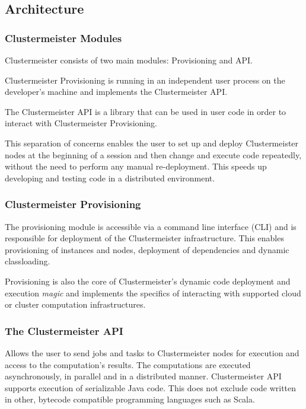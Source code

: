 \documentclass[english]{uzhpub}
\begin{document}
\subsection{Architecture}

\subsubsection{Clustermeister Modules}

Clustermeister consists of two main modules: Provisioning and API.

Clustermeister Provisioning is running in an independent user process on the developer's machine and implements the Clustermeister API.

The Clustermeister API is a library that can be used in user code in order to interact with Clustermeister Provisioning. 

This separation of concerns enables the user to set up and deploy Clustermeister nodes at the beginning of a session and then change and execute code repeatedly, without the need to perform any manual re-deployment. This speeds up developing and testing code in a distributed environment.

\subsubsection{Clustermeister Provisioning}
The provisioning module is accessible via a command line interface (CLI) and is responsible for deployment of the Clustermeister infrastructure. This enables provisioning of instances and nodes, deployment of dependencies and dynamic classloading.

Provisioning is also the core of Clustermeister's dynamic code deployment and execution \textit{magic} and implements the specifics of interacting with supported cloud or cluster computation infrastructures.

\subsubsection{The Clustermeister API}
Allows the user to send jobs and tasks to Clustermeister nodes for execution and access to the computation's results. The computations are executed asynchronously, in parallel and in a distributed manner. Clustermeister API supports execution of serializable Java code. This does not exclude code written in other, bytecode compatible programming languages such as Scala.
\end{document}
